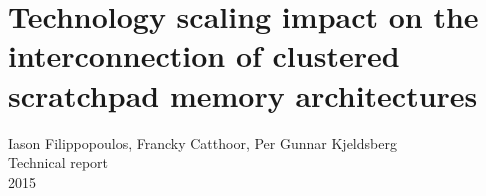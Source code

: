 
%


\chapter{Technology scaling impact on the interconnection of clustered scratchpad memory architectures}
\label{interconnection}

\begin{center}
Iason Filippopoulos, Francky Catthoor, Per Gunnar Kjeldsberg
\\
Technical report
\\
2015
\end{center}
\afterpage{\null\newpage}
\newpage

\vspace*{\fill}
